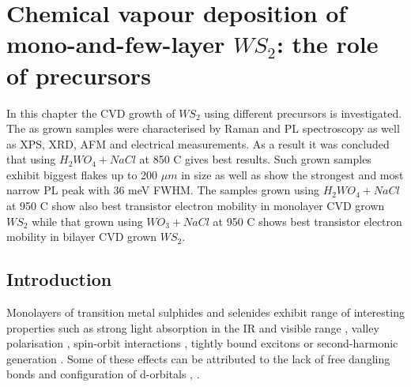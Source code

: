 \chapter{Chemical vapour deposition of mono-and-few-layer $WS_2$: the role of precursors}
\label{cha:WS2}

In this chapter the CVD growth of $WS_2$ using different precursors is investigated. The as grown samples were characterised by Raman and PL spectroscopy as well as XPS, XRD, AFM and electrical measurements. As a result it was concluded that using $H_2WO_4 + NaCl$ at 850 {\degree}C gives best results. Such grown samples exhibit biggest flakes up to 200 $\mu m$ in size as well as show the strongest and most narrow PL peak with 36 meV FWHM. The samples grown using $H_2WO_4 + NaCl$ at 950 {\degree}C show also best transistor electron mobility in monolayer CVD grown $WS_2$ while that grown using $WO_3 + NaCl$ at 950 {\degree}C shows best transistor electron mobility in bilayer CVD grown $WS_2$. 

\section{Introduction}
	
Monolayers of transition metal sulphides and selenides exhibit range of interesting properties such as strong light absorption in the IR and visible range \cite{AtomicallyThinMoS2ANewDirect-GapSemiconductor}\cite{ExtraordinarySunlightAbsorptionAndOneNanometerThickPhotovoltaicsUsingTwo-DimensionalMonolayerMaterials}\cite{EvolutionOfElectronicStructureInAtomicallyThinSheetsOfWS2AndWSe2}, valley polarisation \cite{ControlOfValleyPolarizationInMonolayerMoS2ByOpticalHelicity} \cite{ValleyPolarizationInMoS2MonolayersByOpticalPumping}, spin-orbit interactions \cite{CoupledSpinAndValleyPhysicsInMonolayersOfMoS2AndOtherGroup-VIDichalcogenides}\cite{GiantSpin-orbit-inducedSpinSplittingInTwo-dimensionalTransition-metalDichalcogenideSemiconductors}, tightly bound excitons \cite{Mak2012} or second-harmonic generation \cite{ProbingSymmetryPropertiesOfFew-LayerMoS2Andh-BNByOpticalSecond-HarmonicGeneration}. Some of these effects can be attributed to the lack of free dangling bonds and configuration of d-orbitals \cite{TheTransitionMetalDichalcogenidesDiscussionAndInterpretationOfTheObservedOpticalElectricalAndStructuralProperties}, \cite{ElectronicPropertiesOfMoS2Nanoparticles}.

